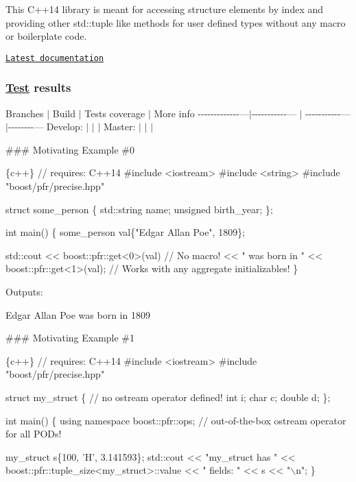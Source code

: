 This C++14 library is meant for accessing structure elements by index and providing other std\+::tuple like methods for user defined types without any macro or boilerplate code.

\href{http://apolukhin.github.com/magic_get/index.html}{\tt Latest documentation}

\subsubsection*{\mbox{\hyperlink{struct_test}{Test}} results}

Branches $\vert$ Build $\vert$ Tests coverage $\vert$ More info -\/-\/-\/-\/-\/-\/-\/-\/-\/-\/-\/-\/-\/---$\vert$-\/-\/-\/-\/-\/-\/-\/-\/-\/-\/-\/--- $\vert$ -\/-\/-\/-\/-\/-\/-\/-\/-\/-\/-\/--- $\vert$-\/-\/-\/-\/-\/-\/-\/-\/--- Develop\+: $\vert$ \href{https://travis-ci.org/apolukhin/magic_get}{\tt } \href{https://ci.appveyor.com/project/apolukhin/magic-get/branch/develop}{\tt } $\vert$ \href{https://coveralls.io/github/apolukhin/magic_get?branch=develop}{\tt } $\vert$ Master\+: $\vert$ \href{https://travis-ci.org/apolukhin/magic_get}{\tt } \href{https://ci.appveyor.com/project/apolukhin/magic-get/branch/master}{\tt } $\vert$ \href{https://coveralls.io/github/apolukhin/magic_get?branch=master}{\tt } $\vert$

\#\#\# Motivating Example \#0 
\begin{DoxyCode}
\{c++\}
// requires: C++14
#include <iostream>
#include <string>
#include "boost/pfr/precise.hpp"

struct some\_person \{
    std::string name;
    unsigned birth\_year;
\};

int main() \{
    some\_person val\{"Edgar Allan Poe", 1809\};

    std::cout << boost::pfr::get<0>(val)                // No macro!
        << " was born in " << boost::pfr::get<1>(val);  // Works with any aggregate initializables!
\}
\end{DoxyCode}
 Outputs\+: 
\begin{DoxyCode}
Edgar Allan Poe was born in 1809
\end{DoxyCode}


\#\#\# Motivating Example \#1 
\begin{DoxyCode}
\{c++\}
// requires: C++14
#include <iostream>
#include "boost/pfr/precise.hpp"

struct my\_struct \{ // no ostream operator defined!
    int i;
    char c;
    double d;
\};

int main() \{
    using namespace boost::pfr::ops; // out-of-the-box ostream operator for all PODs!

    my\_struct s\{100, 'H', 3.141593\};
    std::cout << "my\_struct has " << boost::pfr::tuple\_size<my\_struct>::value
        << " fields: " << s << "\(\backslash\)n";
\}
\end{DoxyCode}


